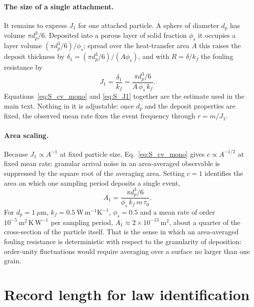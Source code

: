 \documentclass[preprint,12pt]{elsarticle}
\begin{document}
\paragraph*{The size of a single attachment.}
It remains to express $J_1$ for one attached particle. A sphere of diameter
$d_p$ has volume $\pi d_p^{3}/6$. Deposited into a porous layer of solid
fraction $\phi_s$ it occupies a layer volume $(\pi d_p^{3}/6)/\phi_s$;
spread over the heat-transfer area $A$ this raises the deposit thickness by
$\delta_1=(\pi d_p^{3}/6)/(A\phi_s)$, and with $R=\delta/k_f$ the
fouling resistance by
\begin{equation}
  J_1=\frac{\delta_1}{k_f}=\frac{\pi d_p^{3}/6}{A\,\phi_s\,k_f} .
  \label{eq:S_J1}
\end{equation}
Equations~\eqref{eq:S_cv_mono} and \eqref{eq:S_J1} together are the estimate
used in the main text. Nothing in it is adjustable: once $d_p$ and the deposit
properties are fixed, the observed mean rate fixes the event frequency through
$r=m/J_1$.

\paragraph*{Area scaling.}
Because $J_1\propto A^{-1}$ at fixed particle size, Eq.~\eqref{eq:S_cv_mono}
gives $c\propto A^{-1/2}$ at fixed mean rate: granular arrival noise in an
area-averaged observable is suppressed by the square root of the averaging
area. Setting $c=1$ identifies the area on which one sampling period deposits
a single event,
\begin{equation}
  A_1=\frac{\pi d_p^{3}/6}{\phi_s\,k_f\,m\,\tau_0} .
  \label{eq:S_area}
\end{equation}
For $d_p=1~\mu\mathrm{m}$, $k_f=0.5~\mathrm{W\,m^{-1}K^{-1}}$,
$\phi_s=0.5$ and a mean rate of order
$10^{-5}~\mathrm{m^{2}\,K\,W^{-1}}$ per sampling period,
$A_1\approx2\times10^{-13}~\mathrm{m^{2}}$, about a quarter of the
cross-section of the particle itself. That is the sense in which an
area-averaged fouling resistance is deterministic with respect to the
granularity of deposition: order-unity fluctuations would require averaging
over a surface no larger than one grain.

\section{Record length for law identification}
\label{app:record_length}
\end{document}
